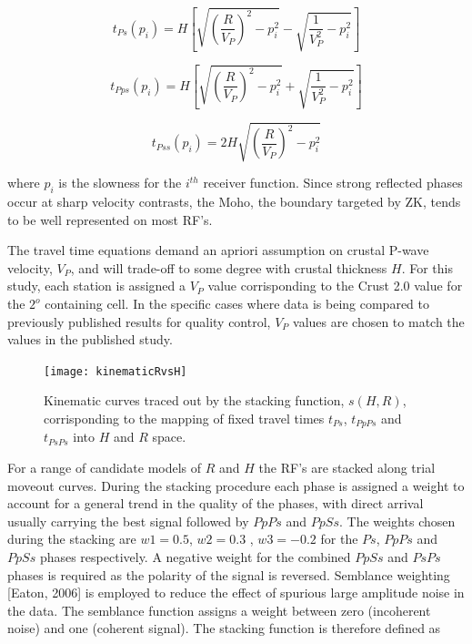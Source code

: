 \documentclass[draft, 12pt]{article}
\begin{document}
\begin{equation} \label{eq:tps}
t_{Ps}(p_i)=H \left[ \sqrt{ \left(\frac{R}{V_P}\right)^2 - p_i^2} - \sqrt{\frac{1}{V_P^2} - p_i^2} \right]
\end{equation}

\begin{equation}
t_{Pps}(p_i)=H \left[ \sqrt{ \left(\frac{R}{V_P}\right)^2 - p_i^2} + \sqrt{\frac{1}{V_P^2} - p_i^2} \right]
\end{equation}

\begin{equation}
t_{Pss}(p_i)= 2H  \sqrt{ \left(\frac{R}{V_P}\right)^2 - p_i^2}
\end{equation}

where $p_i$ is the slowness for the $i^{th}$ receiver function. Since strong reflected phases occur at sharp velocity contrasts, the Moho, the boundary targeted by ZK, tends to be well represented on most RF's.

  The travel time equations demand an apriori assumption on crustal P-wave velocity, $V_P$, and will trade-off to some degree with crustal thickness $H$. For this study, each station is assigned a $V_P$ value corrisponding to the Crust 2.0 value for the $2^o$ containing cell. In the specific cases where data is being compared to previously published results for quality control, $V_P$  values are chosen to match the values in the published study.

\begin{figure}
  \centering
    \texttt{[image: kinematicRvsH]}
  \caption{Kinematic curves traced out by the stacking function, $s(H,R)$, corrisponding to the mapping of fixed travel times $t_{Ps}$, $t_{PpPs}$ and $t_{PsPs}$ into $H$ and $R$ space.}
  \label{fig:kinematicRvsH}
\end{figure}


  For a range of candidate models of $R$ and $H$ the RF's are stacked along trial moveout curves. During the stacking procedure each phase is assigned a weight to account for a general trend in the quality of the phases, with direct arrival usually carrying the best signal followed by $PpPs$ and $PpSs$. The weights chosen during the stacking are $w1 = 0.5$, $w2 = 0.3$ , $w3 = -0.2$ for the $Ps$, $PpPs$ and $PpSs$ phases respectively. A negative weight for the combined $PpSs$ and $PsPs$ phases is required as the polarity of the signal is reversed. Semblance weighting [Eaton, 2006] is employed to reduce the effect of spurious large amplitude noise in the data. The semblance function assigns a weight between zero (incoherent noise) and one (coherent signal). The stacking function is therefore defined as
\end{document}
